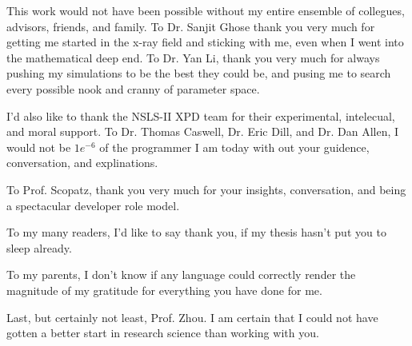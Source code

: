 This work would not have been possible without my entire ensemble of collegues, advisors, friends, and family.
To Dr. Sanjit Ghose thank you very much for getting me started in the x-ray field and sticking with me, even when I went into the mathematical deep end.
To Dr. Yan Li, thank you very much for always pushing my simulations to be the best they could be, and pusing me to search every possible nook and cranny of parameter space.

I'd also like to thank the NSLS-II XPD team for their experimental, intelecual, and moral support.
To Dr. Thomas Caswell, Dr. Eric Dill, and Dr. Dan Allen, I would not be $1e^{-6}$ of the programmer I am today with out your guidence, conversation, and explinations.

To Prof. Scopatz, thank you very much for your insights, conversation, and being a spectacular developer role model.

To my many readers, I'd like to say thank you, if my thesis hasn't put you to sleep already.

To my parents, I don't know if any language could correctly render the magnitude of my gratitude for everything you have done for me.

Last, but certainly not least, Prof. Zhou.
I am certain that I could not have gotten a better start in research science than working with you.
